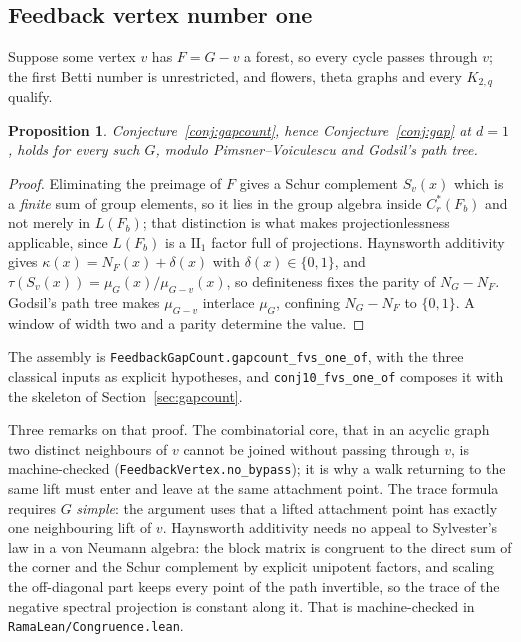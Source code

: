 \documentclass[11pt]{article}
\newtheorem{proposition}[theorem]{Proposition}
\theoremstyle{remark}
\begin{document}
\subsection{Feedback vertex number one}

Suppose some vertex $v$ has $F=G-v$ a forest, so every cycle passes through $v$; the first
Betti number is unrestricted, and flowers, theta graphs and every $K_{2,q}$ qualify.

\begin{proposition}\label{prop:fvs1}
Conjecture~\ref{conj:gapcount}, hence Conjecture~\ref{conj:gap} at $d=1$, holds for every
such $G$, modulo Pimsner--Voiculescu and Godsil's path tree.
\end{proposition}

\begin{proof}
Eliminating the preimage of $F$ gives a Schur complement $S_v(x)$ which is a \emph{finite}
sum of group elements, so it lies in the group algebra inside $C^*_r(F_b)$ and not merely in
$L(F_b)$; that distinction is what makes projectionlessness applicable, since $L(F_b)$ is a
$\mathrm{II}_1$ factor full of projections. Haynsworth additivity gives
$\kappa(x)=N_F(x)+\delta(x)$ with $\delta(x)\in\{0,1\}$, and
$\tau(S_v(x))=\mu_G(x)/\mu_{G-v}(x)$, so definiteness fixes the parity of $N_G-N_F$. Godsil's
path tree makes $\mu_{G-v}$ interlace $\mu_G$, confining $N_G-N_F$ to $\{0,1\}$. A window of
width two and a parity determine the value.
\end{proof}

The assembly is \texttt{FeedbackGapCount.gapcount\_fvs\_one\_of}, with the three classical
inputs as explicit hypotheses, and \texttt{conj10\_fvs\_one\_of} composes it with the
skeleton of Section~\ref{sec:gapcount}.

Three remarks on that proof. The combinatorial core, that in an acyclic graph two distinct
neighbours of $v$ cannot be joined without passing through $v$, is machine-checked
(\texttt{FeedbackVertex.no\_bypass}); it is why a walk returning to the same lift must enter
and leave at the same attachment point. The trace formula requires $G$ \emph{simple}: the
argument uses that a lifted attachment point has exactly one neighbouring lift of $v$.
Haynsworth additivity needs no appeal to Sylvester's law in a von Neumann algebra: the block
matrix is congruent to the direct sum of the corner and the Schur complement by explicit
unipotent factors, and scaling the off-diagonal part keeps every point of the path
invertible, so the trace of the negative spectral projection is constant along it. That is
machine-checked in \texttt{RamaLean/Congruence.lean}.
\end{document}
